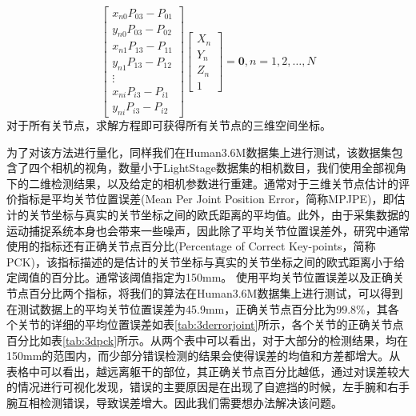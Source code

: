 
\begin{equation}
    \left[ \begin{array}{c}
            x_{n0}P_{03} - P_{01} \\
            y_{n0}P_{03} - P_{02} \\
            x_{n1}P_{13} - P_{11} \\
            y_{n1}P_{13} - P_{12} \\
            \vdots                \\
            x_{ni}P_{i3} - P_{i1} \\
            y_{ni}P_{i3} - P_{i2}
        \end{array}\right] \left[ \begin{array}{c}
            X_n \\
            Y_n \\
            Z_n \\
            1
        \end{array}\right]  = \bm{0}, n = 1,2,\ldots,N
\end{equation}
对于所有关节点，求解方程即可获得所有关节点的三维空间坐标。

为了对该方法进行量化，同样我们在Human3.6M数据集上进行测试，该数据集包含了四个相机的视角，数量小于LightStage数据集的相机数目，我们使用全部视角下的二维检测结果，以及给定的相机参数进行重建。通常对于三维关节点估计的评价指标是平均关节位置误差(Mean Per Joint Position Error，简称MPJPE)，即估计的关节坐标与真实的关节坐标之间的欧氏距离的平均值。此外，由于采集数据的运动捕捉系统本身也会带来一些噪声，因此除了平均关节位置误差外，研究中通常使用的指标还有正确关节点百分比(Percentage of Correct Key-points，简称PCK)，该指标描述的是估计的关节坐标与真实的关节坐标之间的欧式距离小于给定阈值的百分比。通常该阈值指定为150mm。
使用平均关节位置误差以及正确关节点百分比两个指标，将我们的算法在Human3.6M数据集上进行测试，可以得到在测试数据上的平均关节位置误差为45.9mm，正确关节点百分比为99.8\%，其各个关节的详细的平均位置误差如表\ref{tab:3derrorjoint}所示，各个关节的正确关节点百分比如表\ref{tab:3dpck}所示。从两个表中可以看出，对于大部分的检测结果，均在150mm的范围内，而少部分错误检测的结果会使得误差的均值和方差都增大。从表格中可以看出，越远离躯干的部位，其正确关节点百分比越低，通过对误差较大的情况进行可视化发现，错误的主要原因是在出现了自遮挡的时候，左手腕和右手腕互相检测错误，导致误差增大。因此我们需要想办法解决该问题。

